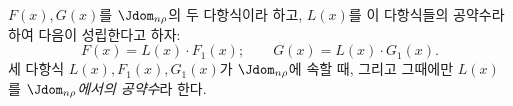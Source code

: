 
$F(x),G(x)$를 $\Jdom_{n\rho}$의 두 다항식이라 하고, $L(x)$를 이 다항식들의 공약수라 하여 다음이 성립한다고 하자:
\[
F(x)=L(x)\cdot F_1(x);\qquad G(x)=L(x)\cdot G_1(x).
\]
세 다항식 $L(x),F_1(x),G_1(x)$가 $\Jdom_{n\rho}$에 속할 때, 그리고 그때에만 $L(x)$를 \emph{$\Jdom_{n\rho}$에서의 공약수}라 한다.
